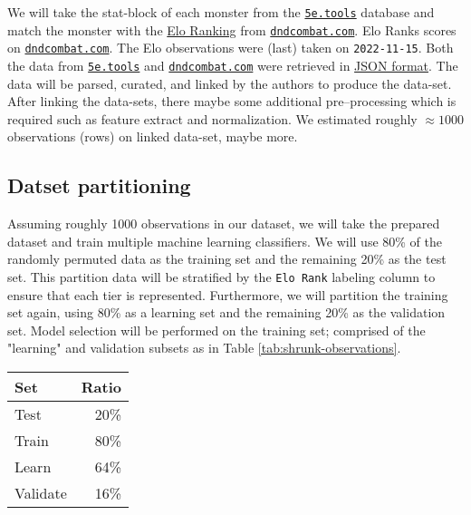 \documentclass{article}
\begin{document}
We will take the stat-block of each monster from the
\href{https://5etools-mirror-1.github.io/}{\texttt{5e.tools}} database
and match the monster with the
\href{https://en.wikipedia.org/wiki/Elo_rating_system}{Elo Ranking} from
\href{https://www.dndcombat.com/dndcombat/Welcome.do?page=Compendium}{\texttt{dndcombat.com}}.
Elo Ranks scores on
\href{https://www.dndcombat.com/dndcombat/Welcome.do?page=Compendium}{\texttt{dndcombat.com}}.
The Elo observations were (last) taken on \texttt{2022-11-15}.
Both the data from
\href{https://5etools-mirror-1.github.io/}{\texttt{5e.tools}} and \href{https://www.dndcombat.com/dndcombat/Welcome.do?page=Compendium}{\texttt{dndcombat.com}}
were retrieved in \href{https://en.wikipedia.org/wiki/JSON}{JSON format}.
The data will be parsed, curated, and linked by the authors to produce the data-set.
After linking the data-sets, there maybe some additional pre--processing which is required such as feature extract and normalization.
We estimated roughly $\approx1000$ observations (rows) on linked data-set, maybe more.


\hypertarget{datset-partitioning}{%
\subsection{Datset partitioning}\label{datset-partitioning}}

Assuming roughly 1000 observations in our dataset, we will take the prepared dataset and train multiple machine learning classifiers. 
We will use 80\% of the randomly permuted data as the training set and the remaining 20\% as the test set.
This partition data will be stratified by the \texttt{\textquotesingle{}Elo\ Rank\textquotesingle{}} labeling column to ensure that each tier is represented.
Furthermore, we will partition the training set again, using 80\% as a learning set and the remaining 20\% as the validation set.
Model selection will be performed on the training set; comprised of the "learning" and validation subsets as in Table \ref{tab:shrunk-observations}.

\begin{table}[!htbp]\centering
\caption{Distribution for partitioning dataset, stratified by \texttt{\textquotesingle{}Elo\ Rank\textquotesingle{}}}
\label{tab:shrunk-observations}
\begin{longtable}[]{@{}lr@{}}
	\toprule
	Set & Ratio \\
	\midrule
	\endhead
	Test & 20\% \\
	Train & 80\% \\
	Learn & 64\% \\
	Validate & 16\% \\
	\bottomrule
\end{longtable}
\end{table}
\end{document}
